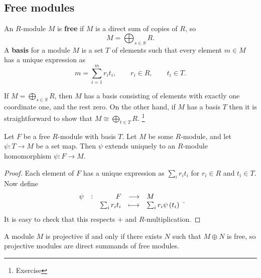 \subsection{Free modules}

\begin{definition}
An $ R $-module $ M $ is \textbf{free} if $ M $ is a direct sum of copies of $ R $, so
$$ M = \bigoplus_{s \in S} R. $$
A \textbf{basis} for a module $ M $ is a set $ T $ of elements such that every element $ m \in M $ has a unique expression as
$$ m = \sum_{i = 1}^m r_it_i, \qquad r_i \in R, \qquad t_i \in T. $$
\end{definition}

If $ M = \bigoplus_{s \in S} R $, then $ M $ has a basis consisting of elements with exactly one coordinate one, and the rest zero. On the other hand, if $ M $ has a basis $ T $ then it is straightforward to show that $ M \cong \bigoplus_{t \in T} R $. \footnote{Exercise}

\begin{proposition}
Let $ F $ be a free $ R $-module with basis $ T $. Let $ M $ be some $ R $-module, and let $ \psi : T \to M $ be a set map. Then $ \psi $ extends uniquely to an $ R $-module homomorphism $ \psi : F \to M $.
\end{proposition}

\begin{proof}
Each element of $ F $ has a unique expression as $ \sum_i r_it_i $ for $ r_i \in R $ and $ t_i \in T $. Now define
$$ \function[\psi]{F}{M}{\sum_i r_it_i}{\sum_i r_i\psi\br{t_i}}. $$
It is easy to check that this respects $ + $ and $ R $-multiplication.
\end{proof}

\begin{proposition}
A module $ M $ is projective if and only if there exists $ N $ such that $ M \oplus N $ is free, so projective modules are direct summands of free modules.
\end{proposition}


